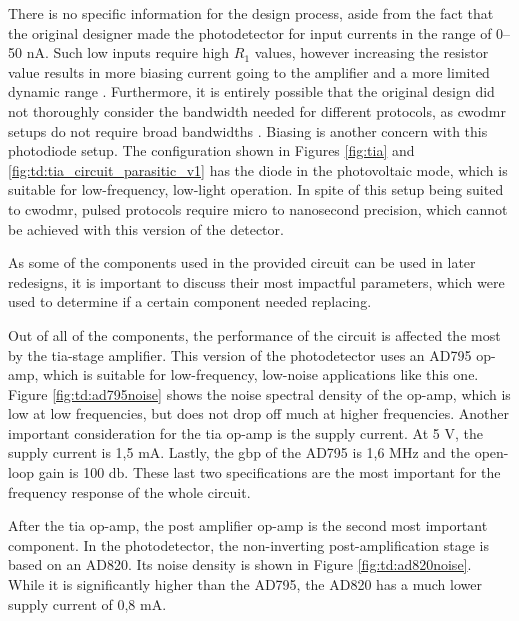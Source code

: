 There is no specific information for the design process, aside from the fact that the original designer made the photodetector for input currents in the range of \numrange{0}{50} \unit{\nano\ampere}. Such low inputs require high $R_1$ values, however increasing the resistor value results in more biasing current going to the amplifier and a more limited dynamic range \cite{black2021tia}. Furthermore, it is entirely possible that the original design did not thoroughly consider the bandwidth needed for different protocols, as \gls{cwodmr} setups do not require broad bandwidths \cite{acharya2025compact}. Biasing is another concern with this photodiode setup. The configuration shown in Figures \ref{fig:tia} and \ref{fig:td:tia_circuit_parasitic_v1} has the diode in the photovoltaic mode, which is suitable for low-frequency, low-light operation. In spite of this setup being suited to \gls{cwodmr}, pulsed protocols require micro to nanosecond precision, which cannot be achieved with this version of the detector.

As some of the components used in the provided circuit can be used in later redesigns, it is important to discuss their most impactful parameters, which were used to determine if a certain component needed replacing.

Out of all of the components, the performance of the circuit is affected the most by the \gls{tia}-stage amplifier. This version of the photodetector uses an AD795 op-amp, which is suitable for low-frequency, low-noise applications like this one. Figure \ref{fig:td:ad795noise} shows the noise spectral density of the op-amp, which is low at low frequencies, but does not drop off much at higher frequencies. Another important consideration for the \gls{tia} op-amp is the supply current. At 5 \unit{\volt}, the supply current is 1,5 \unit{\milli\ampere}. Lastly, the \gls{gbp} of the AD795 is 1,6 \unit{\mega\hertz} and the open-loop gain is 100 \unit{\decibel}. These last two specifications are the most important for the frequency response of the whole circuit.

After the \gls{tia} op-amp, the post amplifier op-amp is the second most important component. In the photodetector, the non-inverting post-amplification stage is based on an AD820. Its noise density is shown in Figure \ref{fig:td:ad820noise}. While it is significantly higher than the AD795, the AD820 has a much lower supply current of 0,8 \unit{\milli\ampere}.


